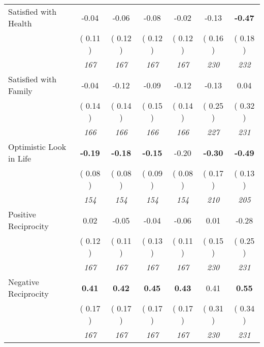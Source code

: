 \begin{tabular}{l c c c c c c}
Satisfied with Health &     -0.04 &     -0.06 &     -0.08 &     -0.02 &     -0.13 & \textbf{     -0.47 } \\
& (     0.11 ) & (     0.12 ) & (     0.12 ) & (     0.12 ) & (     0.16 ) & (     0.18 ) \\
& \textit{ 167 } & \textit{ 167 } & \textit{ 167 } & \textit{ 167 } & \textit{ 230 } & \textit{ 232 } \\
Satisfied with Family &     -0.04 &     -0.12 &     -0.09 &     -0.12 &     -0.13 &      0.04 \\
& (     0.14 ) & (     0.14 ) & (     0.15 ) & (     0.14 ) & (     0.25 ) & (     0.32 ) \\
& \textit{ 166 } & \textit{ 166 } & \textit{ 166 } & \textit{ 166 } & \textit{ 227 } & \textit{ 231 } \\
Optimistic Look in Life & \textbf{     -0.19 } & \textbf{     -0.18 } & \textbf{     -0.15 } &     -0.20 & \textbf{     -0.30 } & \textbf{     -0.49 } \\
& (     0.08 ) & (     0.08 ) & (     0.09 ) & (     0.08 ) & (     0.17 ) & (     0.13 ) \\
& \textit{ 154 } & \textit{ 154 } & \textit{ 154 } & \textit{ 154 } & \textit{ 210 } & \textit{ 205 } \\
Positive Reciprocity &      0.02 &     -0.05 &     -0.04 &     -0.06 &      0.01 &     -0.28 \\
& (     0.12 ) & (     0.11 ) & (     0.13 ) & (     0.11 ) & (     0.15 ) & (     0.25 ) \\
& \textit{ 167 } & \textit{ 167 } & \textit{ 167 } & \textit{ 167 } & \textit{ 230 } & \textit{ 231 } \\
Negative Reciprocity & \textbf{      0.41 } & \textbf{      0.42 } & \textbf{      0.45 } & \textbf{     0.43} &      0.41 & \textbf{      0.55 } \\
& (     0.17 ) & (     0.17 ) & (     0.17 ) & (     0.17 ) & (     0.31 ) & (     0.34 ) \\
& \textit{ 167 } & \textit{ 167 } & \textit{ 167 } & \textit{ 167 } & \textit{ 230 } & \textit{ 231 } \\
\bottomrule
\end{tabular}
